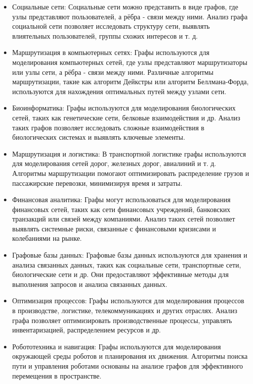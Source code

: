 \begin{itemize}
	\item Социальные сети: Социальные сети можно представить в виде графов, где узлы представляют пользователей, а рёбра - связи между ними. Анализ графа социальной сети позволяет исследовать структуру сети, выявлять влиятельных пользователей, группы схожих интересов и т. д.
	
	\item Маршрутизация в компьютерных сетях: Графы используются для моделирования компьютерных сетей, где узлы представляют маршрутизаторы или узлы сети, а рёбра - связи между ними. Различные алгоритмы маршрутизации, такие как алгоритм Дейкстры или алгоритм Беллмана-Форда, используются для нахождения оптимальных путей между узлами сети.
	
	\item Биоинформатика: Графы используются для моделирования биологических сетей, таких как генетические сети, белковые взаимодействия и др. Анализ таких графов позволяет исследовать сложные взаимодействия в биологических системах и выявлять ключевые элементы.
	
	\item Маршрутизация и логистика: В транспортной логистике графы используются для моделирования сетей дорог, железных дорог, авиалиний и т. д. Алгоритмы маршрутизации помогают оптимизировать распределение грузов и пассажирские перевозки, минимизируя время и затраты.
	
	\item Финансовая аналитика: Графы могут использоваться для моделирования финансовых сетей, таких как сети финансовых учреждений, банковских транзакций или связей между компаниями. Анализ таких сетей позволяет выявлять системные риски, связанные с финансовыми кризисами и колебаниями на рынке.
	
	\item Графовые базы данных: Графовые базы данных используются для хранения и анализа связанных данных, таких как социальные сети, транспортные сети, биологические сети и др. Они предоставляют эффективные методы для выполнения запросов и анализа связанных данных.
	
	\item Оптимизация процессов: Графы используются для моделирования процессов в производстве, логистике, телекоммуникациях и других отраслях. Анализ графа позволяет оптимизировать производственные процессы, управлять инвентаризацией, распределением ресурсов и др.
	
	\item Робототехника и навигация: Графы используются для моделирования окружающей среды роботов и планирования их движения. Алгоритмы поиска пути и управления роботами основаны на анализе графов для эффективного перемещения в пространстве.
\end{itemize}


